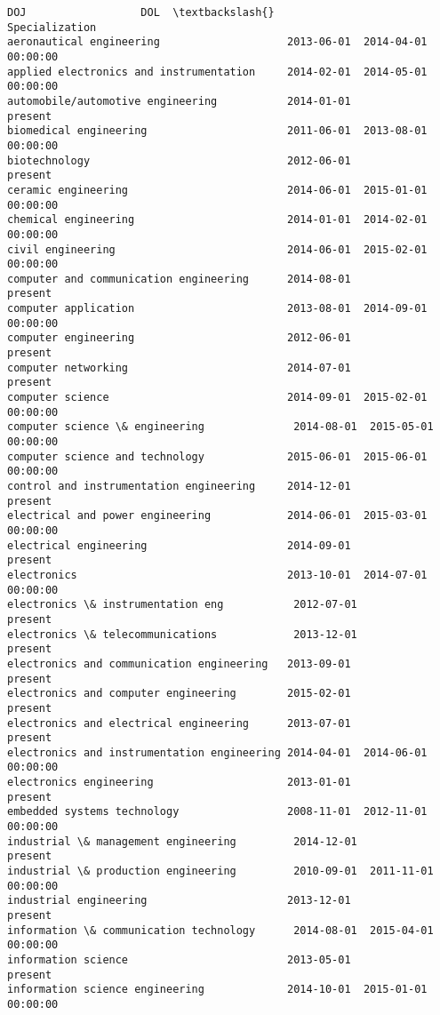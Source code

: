 \documentclass[11pt]{article}
\begin{document}
\begin{tcolorbox}[breakable, size=fbox, boxrule=.5pt, pad at break*=1mm, opacityfill=0]
\begin{Verbatim}[commandchars=\\\{\}]
                                                   DOJ                  DOL  \textbackslash{}
Specialization
aeronautical engineering                    2013-06-01  2014-04-01 00:00:00
applied electronics and instrumentation     2014-02-01  2014-05-01 00:00:00
automobile/automotive engineering           2014-01-01              present
biomedical engineering                      2011-06-01  2013-08-01 00:00:00
biotechnology                               2012-06-01              present
ceramic engineering                         2014-06-01  2015-01-01 00:00:00
chemical engineering                        2014-01-01  2014-02-01 00:00:00
civil engineering                           2014-06-01  2015-02-01 00:00:00
computer and communication engineering      2014-08-01              present
computer application                        2013-08-01  2014-09-01 00:00:00
computer engineering                        2012-06-01              present
computer networking                         2014-07-01              present
computer science                            2014-09-01  2015-02-01 00:00:00
computer science \& engineering              2014-08-01  2015-05-01 00:00:00
computer science and technology             2015-06-01  2015-06-01 00:00:00
control and instrumentation engineering     2014-12-01              present
electrical and power engineering            2014-06-01  2015-03-01 00:00:00
electrical engineering                      2014-09-01              present
electronics                                 2013-10-01  2014-07-01 00:00:00
electronics \& instrumentation eng           2012-07-01              present
electronics \& telecommunications            2013-12-01              present
electronics and communication engineering   2013-09-01              present
electronics and computer engineering        2015-02-01              present
electronics and electrical engineering      2013-07-01              present
electronics and instrumentation engineering 2014-04-01  2014-06-01 00:00:00
electronics engineering                     2013-01-01              present
embedded systems technology                 2008-11-01  2012-11-01 00:00:00
industrial \& management engineering         2014-12-01              present
industrial \& production engineering         2010-09-01  2011-11-01 00:00:00
industrial engineering                      2013-12-01              present
information \& communication technology      2014-08-01  2015-04-01 00:00:00
information science                         2013-05-01              present
information science engineering             2014-10-01  2015-01-01 00:00:00

\end{Verbatim}
\end{tcolorbox}
\end{document}
